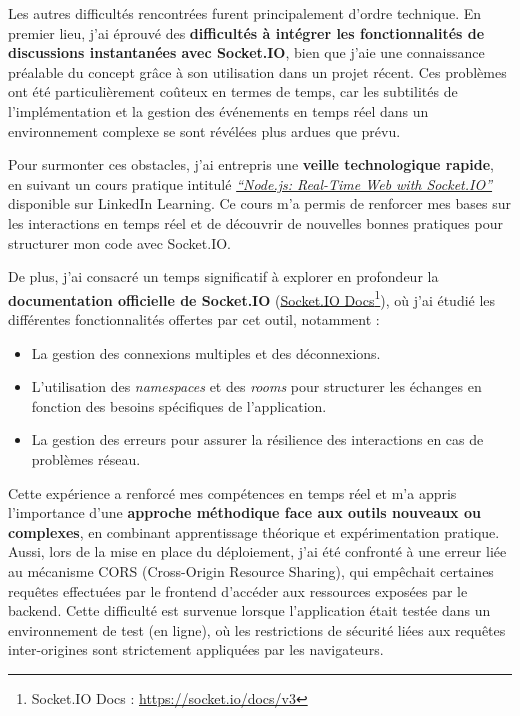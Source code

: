 Les autres difficultés rencontrées furent principalement d'ordre technique. En premier lieu, j'ai éprouvé des \textbf{difficultés à intégrer les fonctionnalités de discussions instantanées avec Socket.IO}, bien que j’aie une connaissance préalable du concept grâce à son utilisation dans un projet récent. Ces problèmes ont été particulièrement coûteux en termes de temps, car les subtilités de l'implémentation et la gestion des événements en temps réel dans un environnement complexe se sont révélées plus ardues que prévu.

Pour surmonter ces obstacles, j'ai entrepris une \textbf{veille technologique rapide}, en suivant un cours pratique intitulé \textit{\href{https://www.linkedin.com/learning/node-js-real-time-web-with-socket-io}{``Node.js: Real-Time Web with Socket.IO''}} disponible sur LinkedIn Learning. Ce cours m’a permis de renforcer mes bases sur les interactions en temps réel et de découvrir de nouvelles bonnes pratiques pour structurer mon code avec Socket.IO.

De plus, j’ai consacré un temps significatif à explorer en profondeur la \textbf{documentation officielle de Socket.IO} (\href{https://socket.io/docs/v3}{Socket.IO Docs}\footnote{Socket.IO Docs : \href{https://socket.io/docs/v3}{https://socket.io/docs/v3}}), où j’ai étudié les différentes fonctionnalités offertes par cet outil, notamment :  
\begin{itemize}
    \item La gestion des connexions multiples et des déconnexions.
    \item L’utilisation des \textit{namespaces} et des \textit{rooms} pour structurer les échanges en fonction des besoins spécifiques de l’application.
    \item La gestion des erreurs pour assurer la résilience des interactions en cas de problèmes réseau.
\end{itemize}

Cette expérience a renforcé mes compétences en temps réel et m’a appris l’importance d’une \textbf{approche méthodique face aux outils nouveaux ou complexes}, en combinant apprentissage théorique et expérimentation pratique. \\

Aussi, lors de la mise en place du déploiement, j'ai été confronté à une erreur liée au mécanisme CORS (Cross-Origin Resource Sharing), qui empêchait certaines requêtes effectuées par le frontend d’accéder aux ressources exposées par le backend. Cette difficulté est survenue lorsque l’application était testée dans un environnement de test (en ligne), où les restrictions de sécurité liées aux requêtes inter-origines sont strictement appliquées par les navigateurs.\\

